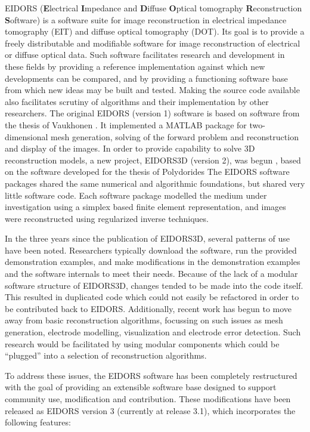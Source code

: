 \documentclass[12pt]{iopart}
\begin{document}
EIDORS
({\bf E}lectrical
 {\bf I}mpedance and
 {\bf D}iffuse
 {\bf O}ptical tomography
 {\bf R}econstruction
 {\bf S}oftware)
is a software suite for image reconstruction in
electrical impedance tomography (EIT) and diffuse optical tomography (DOT).
Its goal is to provide a freely distributable and modifiable
software for image reconstruction of electrical 
or diffuse optical data. Such software facilitates research
and development
in these fields by providing a reference implementation
against which new developments can be compared, and by
providing a functioning software base from which new
ideas may be built and tested.
Making the source code available also facilitates scrutiny
of algorithms and their implementation by other researchers.
The original EIDORS (version 1) software \cite{Vauhkonen_etal_2000}
is based on software from the thesis of Vaukhonen \cite{Vauhkonen_1997}.
It implemented a MATLAB package for two-dimensional mesh generation,
solving of the forward
problem and reconstruction and display of the images.
In order to provide capability to solve 3D reconstruction models,
a new project, EIDORS3D (version 2), was begun \cite{Polydorides_and_Lionheart_2002},
based on the software developed for the thesis of Polydorides \cite{Polydorides_2002}
The EIDORS software packages shared the same numerical
and algorithmic foundations, but shared very little software code.
Each software package modelled the medium under investigation
using a simplex based finite element representation,
and images were reconstructed using regularized inverse techniques.

In the three years since the publication of EIDORS3D, several patterns
of use have been noted. Researchers typically download the software,
run the provided demonstration examples,  and 
make modifications in the demonstration examples and the software
internals to meet their needs.
Because of the lack of a modular software structure of EIDORS3D,
changes tended to be made into the code itself. This resulted in
duplicated
code which could not easily be refactored in order to
be contributed back to EIDORS. Additionally, recent work has begun to move
away from basic reconstruction algorithms, focussing
on such issues as mesh generation, electrode modelling, visualization
and electrode error detection. Such research would be facilitated
by using modular components which could be ``plugged'' into
a selection of reconstruction algorithms.

To address these issues, the EIDORS software has been completely
restructured with the goal of providing an extensible software base
designed to support community use, modification and contribution.
These modifications have been released as EIDORS version 3
(currently at release 3.1), which incorporates the following features:
\end{document}
